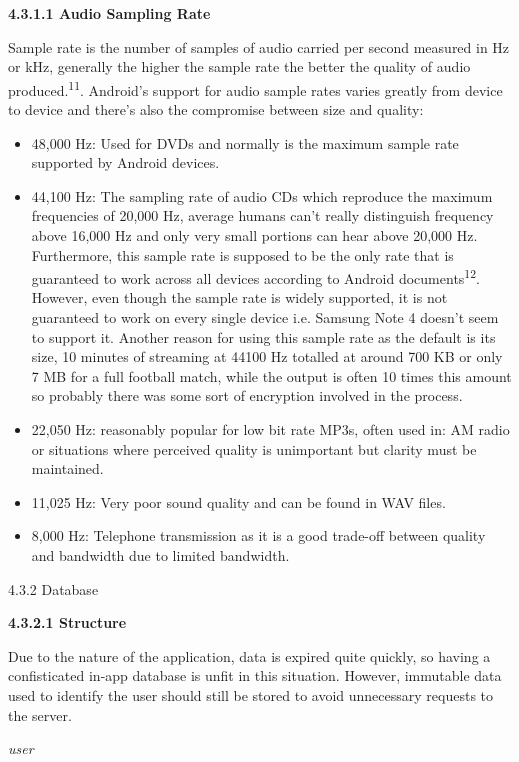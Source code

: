 \documentclass{article}
\begin{document}
\begin{flushleft}
\begin{itemize}
\end{itemize} 
\textbf {4.3.1.1 Audio Sampling Rate}\par
Sample rate is the number of samples of audio carried per second measured in Hz or kHz, generally the higher the sample rate the better the quality of audio produced.\textsuperscript{11}. Android's support for audio sample rates varies greatly from device to device and there's also the compromise between size and quality:
\begin{itemize}
	\item 48,000 Hz: Used for DVDs and normally is the maximum sample rate supported by Android devices.\\
	\item 44,100 Hz: The sampling rate of audio CDs which reproduce the maximum frequencies of 20,000 Hz, average humans can't really distinguish frequency above 16,000 Hz and only very small portions can hear above 20,000 Hz. Furthermore, this sample rate is supposed to be the only rate that is guaranteed to work across all devices according to Android documents\textsuperscript{12}. However, even though the sample rate is widely supported, it is not guaranteed to work on every single device i.e. Samsung Note 4 doesn't seem to support it. Another reason for using this sample rate as the default is its size, 10 minutes of streaming at 44100 Hz totalled at around 700 KB or only 7 MB for a full football match, while the output is often 10 times this amount so probably there was some sort of encryption involved in the process.
	\item 22,050 Hz: reasonably popular for low bit rate MP3s,  often used in: AM radio or situations where perceived quality is unimportant but clarity must be maintained.
	\item 11,025 Hz: Very poor sound quality and can be found in WAV files.
	\item 8,000 Hz: Telephone transmission as it is a good trade-off between quality and bandwidth due to limited bandwidth.
\end{itemize}
{\large 4.3.2 Database}\par
{\textbf {4.3.2.1 Structure}}\par
Due to the nature of the application, data is expired quite quickly, so having a confisticated in-app database is unfit in this situation. However, immutable data used to identify the user should still be stored to avoid unnecessary requests to the server.\par
\textit{user}\\

\end{flushleft}
\end{document}
